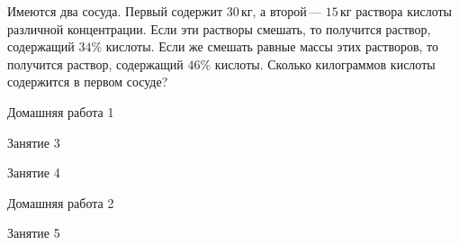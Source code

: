 \begin{class}[number=2]
\begin{listofex}
		
		\item Имеются два сосуда. Первый содержит \(30\) кг, а второй --- \(15\) кг раствора кислоты различной концентрации. Если эти растворы смешать, то получится раствор, содержащий \(34\%\) кислоты. Если же смешать равные массы этих растворов, то получится раствор, содержащий \(46\%\) кислоты. Сколько килограммов кислоты содержится в первом сосуде?
	\end{listofex}
\end{class}

\begin{homework}[number=1]
	\begin{listofex}
		\item Домашняя работа 1
	\end{listofex}
\end{homework}

\begin{class}[number=3]
	\begin{listofex}
		\item Занятие 3 
	\end{listofex}
\end{class}

\begin{class}[number=4]
	\begin{listofex}
		\item Занятие 4
	\end{listofex}
\end{class}

\begin{homework}[number=2]
	\begin{listofex}
		\item Домашняя работа 2
	\end{listofex}
\end{homework}

\begin{class}[number=5]
	\begin{listofex}
		\item Занятие 5
	\end{listofex}
\end{class}

